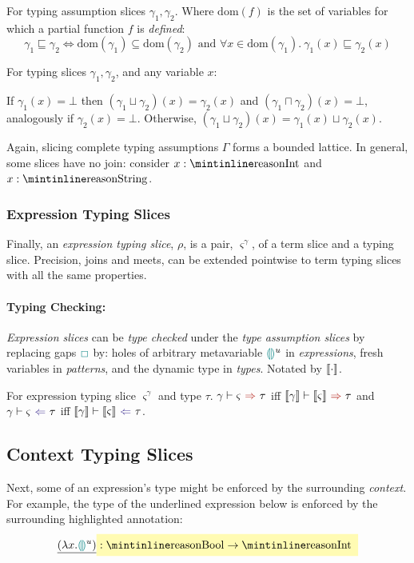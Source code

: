 \begin{definition}
For typing assumption slices $\gamma_1, \gamma_2$. Where $\mathrm{dom}(f)$ is the set of variables for which a partial function $f$ is \textit{defined}:
\[\gamma_1 \sqsubseteq \gamma_2 \iff \mathrm{dom}(\gamma_1) \subseteq \mathrm{dom}(\gamma_2) \text{ and } \forall x \in  \mathrm{dom}(\gamma_1).\ \gamma_1(x) \sqsubseteq \gamma_2(x)\]
\end{definition}
\begin{definition}
For typing slices $\gamma_1, \gamma_2$, and any variable $x$: 

If $\gamma_1(x) = \bot$ then $(\gamma_1 \sqcup \gamma_2)(x) = \gamma_2(x)$ and $(\gamma_1 \sqcap \gamma_2)(x) = \bot$, analogously if $\gamma_2(x) = \bot$. Otherwise, $(\gamma_1 \sqcup \gamma_2)(x) = \gamma_1(x) \sqcup \gamma_2(x)$.
\end{definition}
Again, slicing complete typing assumptions $\Gamma$ forms a bounded lattice. In general, some slices have no join: consider $x : \code{Int}$ and $x : \code{String}$.

\subsubsection{Expression Typing Slices}
Finally, an \textit{expression typing slice}, $\rho$, is a pair, $\varsigma^\gamma$, of a term slice and a typing slice. Precision, joins and meets, can be extended pointwise to term typing slices with all the same properties.

\paragraph{Typing Checking:} \textit{Expression slices} can be \textit{type checked} under the \textit{type assumption slices} by replacing gaps ${\color{teal}\Box}$ by: holes of arbitrary metavariable ${\color{teal}\llparenthesis}  {\color{teal}\rrparenthesis}^u$ in \textit{expressions}, fresh variables in \textit{patterns}, and the dynamic type in \textit{types}. Notated by $\llbracket \cdot \rrbracket$.

\begin{definition}
For expression typing slice $\varsigma^{\gamma}$ and type $\tau$. $\synthesis[\gamma]{\varsigma}{\tau}$ iff $\synthesis[\type{\gamma}]{\type{\varsigma}}{\tau}$ and $\analysis[\gamma]{\varsigma}{\tau}$ iff $\analysis[\type{\gamma}]{\type{\varsigma}}{\tau}$.
\end{definition}
\subsection{Context Typing Slices}\label{sec:ContextTypingSlices}
Next, some of an expression's type might be enforced by the surrounding \textit{context}. For example, the  type of the underlined expression below is enforced by the surrounding highlighted annotation:
\[\underline{(\lambda x. \hole^u )} \hlcmaths[yellow!30]{:  \code{Bool} \hlcmaths[yellow!30]{\to \code{Int}}}\]

